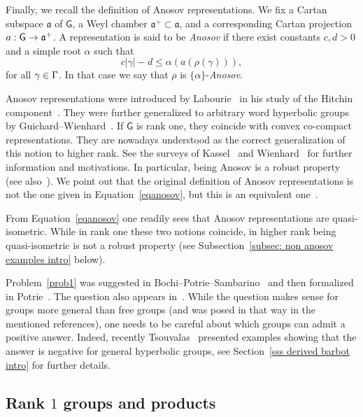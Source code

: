 \documentclass[AHL,Unicode,longabstracts]{cedram}
\newcommand{\sG}{\mathsf{G}}
\renewcommand{\a}{\mathfrak{a}}
\newcommand{\ap}{\mathfrak{a}^+}
\renewcommand*{\to}{\mathchoice{\longrightarrow}{\rightarrow}{\rightarrow}{\rightarrow}}
\let\oldin\in
\renewcommand{\in}{\mathchoice{\oldin}{\oldin}{\,\oldin\,}{\,\oldin\,}}
\begin{document}
Finally, we recall the definition of Anosov representations. We fix a Cartan subspace $\a$ of $\sG$, a Weyl chamber $\ap\subset\a$, and a corresponding Cartan projection $a:\sG \to \ap$. A representation is said to be \emph{Anosov} if there exist constants $c,d > 0$ and a simple root $\alpha$ such that
\begin{equation}\label{eqanosov}
c |\gamma| - d \le \alpha(a(\rho(\gamma))),
\end{equation}
for all $\gamma \in \Gamma$. In that case we say that $\rho$ is $\{\alpha\}$-\emph{Anosov}.

Anosov representations were introduced by Labourie~\cite{labourie} in his study of the Hitchin component~\cite{hitchin}. They were further generalized to arbitrary word hyperbolic groups by Guichard--Wienhard~\cite{GW}. If $\sG$ is rank one, they coincide with convex co-compact representations. They are nowadays understood as the correct generalization of this notion to higher rank. See the surveys of Kassel~\cite{kassel} and Wienhard~\cite{weinhard} for further information and motivations. In particular, being Anosov is a robust property~\cite{GW,labourie} (see also~\cite[Corollary~5.10]{BPS}). We point out that the original definition of Anosov representations is not the one given in Equation~\eqref{eqanosov}, but this is an equivalent one~\cite{BPS,GGKW,KLP}.

From Equation~\eqref{eqanosov} one readily sees that Anosov representations are quasi-isometric. While in rank one these two notions coincide, in higher rank being quasi-isometric is not a robust property (see Subsection~\ref{subsec: non anosov examples intro} below).

Problem~\ref{prob1} was suggested in Bochi--Potrie--Sambarino~\cite[Section~4.4]{BPS} and then formalized in Potrie~\cite[Section~4.3]{potrie}. The question also appears in~\cite[Section~8]{kassel}. While the question makes sense for groups more general than free groups (and was posed in that way in the mentioned references), one needs to be careful about which groups can admit a positive answer. Indeed, recently Tsouvalas~\cite{tsouvalas2} presented examples showing that the answer is negative for general hyperbolic groups, see Section~\ref{sss derived barbot intro} for further details.


\subsection{Rank $1$ groups and products}
\end{document}
